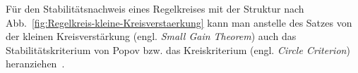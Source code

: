 \medskip{}

Für den Stabilitätsnachweis eines Regelkreises mit der Struktur nach
Abb.~\ref{fig:Regelkreis-kleine-Kreisverstaerkung} kann man anstelle
des Satzes von der kleinen Kreisverstärkung (engl. \emph{Small Gain
Theorem}) auch das Stabilitätskriterium von Popov bzw. das Kreiskriterium
(engl. \emph{Circle Criterion}) her\-an\-ziehen~\cite{slotine1991,sepulchre97,khalil2002,adamy2014}.




